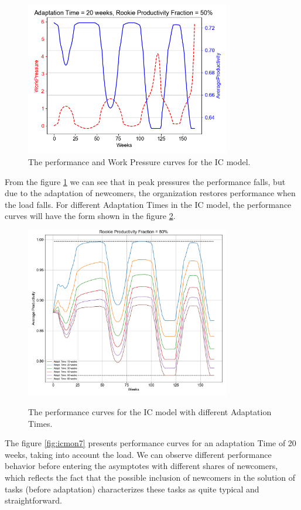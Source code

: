 \documentclass[12pt]{report}
\theoremstyle{definition}
\begin{document}
\begin{figure}[ht]
	\centering
	\includegraphics[width=0.8\textwidth]{icmon5}
	\caption{The performance and Work Pressure curves for the IC model.}
	\label{fig:icmon5}
\end{figure} 

From the figure \ref{fig:icmon5} we can see that in peak pressures the performance falls, but due to the adaptation of newcomers, the organization restores performance when the load falls. 
For different Adaptation Times in the IC model, the performance curves will have the form shown in the figure  \ref{fig:icmon6}.

\begin{figure}[ht]
	\centering
	\includegraphics[width=0.8\textwidth]{icmon6}
	\label{fig:icmon6}
	\caption{The performance curves for the IC model with different Adaptation Times.}
\end{figure}

The figure \ref{fig:icmon7} presents performance curves for an adaptation Time of 20 weeks, taking into account the load.
We can observe different performance behavior before entering the asymptotes with different shares of newcomers, which reflects the fact that the possible inclusion of newcomers in the solution of tasks (before adaptation) characterizes these tasks as quite typical and straightforward.
\end{document}
